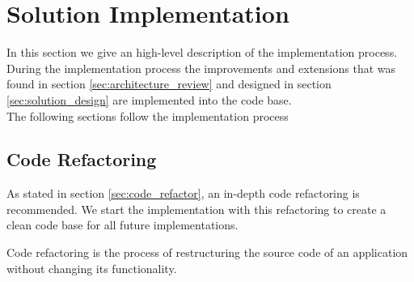 \section{Solution Implementation}
\label{sec:solution_implementation}


In this section we give an high-level description of the implementation process.
During the implementation process the improvements and extensions that was found in section \ref{sec:architecture_review} and designed in section \ref{sec:solution_design} are implemented into the code base.
\\

The following sections follow the implementation process


\subsection{Code Refactoring}
\label{sec:impl_code_refactor}
As stated in section \ref{sec:code_refactor}, an in-depth code refactoring is recommended.
We start the implementation with this refactoring to create a clean code base for all future implementations.

Code refactoring is the process of restructuring the source code of an application without changing its functionality\cite{fowlerRefactoringImprovingDesign2019a}.